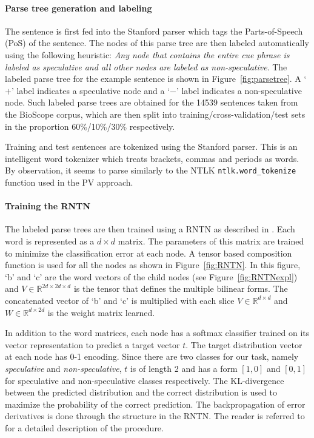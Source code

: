 \documentclass{article}
\begin{document}
\paragraph{Parse tree generation and labeling} The sentence is first fed into the Stanford parser which tags the Parts-of-Speech (PoS) of the sentence. The nodes of this parse tree are then labeled automatically using the following heuristic: {\it Any node that contains the entire cue phrase is labeled as speculative and all other nodes are labeled as non-speculative}. The labeled parse tree for the example sentence is shown in Figure~\ref{fig:parsetree}. A `$+$' label indicates a speculative node and a `$-$' label indicates a non-speculative node. Such labeled parse trees are obtained for the 14539 sentences taken from the BioScope corpus, which are then split into training/cross-validation/test sets in the proportion 60\%/10\%/30\% respectively.

Training and test sentences are tokenized using the Stanford parser. This is an intelligent word tokenizer which treats brackets, commas and periods as words. By observation, it seems to parse similarly to the NTLK \texttt{ntlk.word\_tokenize} function used in the PV approach.

\paragraph{Training the RNTN} The labeled parse trees are then trained using a RNTN as described in \textcite{Socher2013}. Each word is represented as a $d \times d$ matrix. The parameters of this matrix are trained to minimize the classification error at each node. A tensor based composition function is used for all the nodes as shown in Figure~\ref{fig:RNTN}. In this figure, `b' and `c' are the word vectors of the child nodes (see Figure~\ref{fig:RNTNexpl}) and $V \in \mathbb{R}^{2d \times 2d \times d}$ is the tensor that defines the multiple bilinear forms. The concatenated vector of `b' and `c' is multiplied with each slice $V \in \mathbb{R}^{d \times d}$ and $W \in \mathbb{R}^{d \times 2d}$ is the weight matrix learned. 
%
%


In addition to the word matrices, each node has a softmax classifier trained on its vector representation to predict a target vector $t$. The target distribution vector at each node has 0-1 encoding. Since there are two classes for our task, namely {\it speculative} and {\it non-speculative}, $t$ is of length 2 and has a form $[1,0]$ and $[0,1]$ for speculative and non-speculative classes respectively. The KL-divergence between the predicted distribution and the correct distribution is used to maximize the probability of the correct prediction. The backpropagation of error derivatives is done through the structure in the RNTN. The reader is referred to \textcite{Socher2013} for a detailed description of the procedure. 
\end{document}
